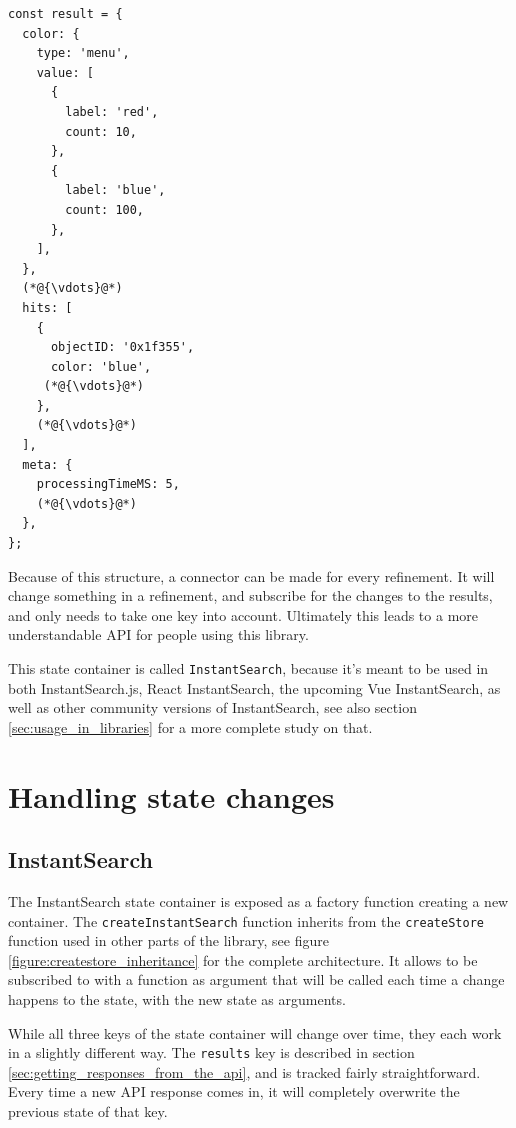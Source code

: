 \begin{lstlisting}[caption={Results container in the InstantSearch Core state},label={lst:is-core-state-4}]
const result = {
  color: {
    type: 'menu',
    value: [
      {
        label: 'red',
        count: 10,
      },
      {
        label: 'blue',
        count: 100,
      },
    ],
  },
  (*@{\vdots}@*)
  hits: [
    {
      objectID: '0x1f355',
      color: 'blue',
     (*@{\vdots}@*)
    },
    (*@{\vdots}@*)
  ],
  meta: { 
    processingTimeMS: 5,
    (*@{\vdots}@*)
  },
};
\end{lstlisting}

Because of this structure, a connector can be made for every refinement. It will change something in a refinement, and subscribe for the changes to the results, and only needs to take one key into account. Ultimately this leads to a more understandable API for people using this library.

This state container is called {\tt InstantSearch}, because it's meant to be used in both InstantSearch.js, React InstantSearch, the upcoming Vue InstantSearch, as well as other community versions of InstantSearch, see also section \ref{sec:usage_in_libraries} for a more complete study on that.


\section{Handling state changes} %
\label{sec:handling_state_changes}

\subsection{InstantSearch}
\label{ssec:instantsearch}

The InstantSearch state container is exposed as a factory function creating a new container. The {\tt createInstantSearch} function inherits from the {\tt createStore} function used in other parts of the library, see figure \ref{figure:createstore_inheritance} for the complete architecture. It allows to be subscribed to with a function as argument that will be called each time a change happens to the state, with the new state as arguments.

While all three keys of the state container will change over time, they each work in a slightly different way. The {\tt results} key is described in section \ref{sec:getting_responses_from_the_api}, and is tracked fairly straightforward. Every time a new API response comes in, it will completely overwrite the previous state of that key. 

